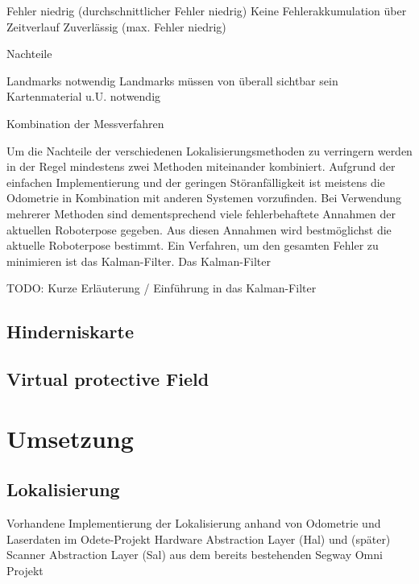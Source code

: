     Fehler niedrig (durchschnittlicher Fehler niedrig)
    Keine Fehlerakkumulation über Zeitverlauf
    Zuverlässig (max. Fehler niedrig) 

Nachteile

    Landmarks notwendig
    Landmarks müssen von überall sichtbar sein
    Kartenmaterial u.U. notwendig 
    
Kombination der Messverfahren

Um die Nachteile der verschiedenen Lokalisierungsmethoden zu verringern werden in der Regel mindestens zwei Methoden miteinander kombiniert. Aufgrund der einfachen Implementierung und der geringen Störanfälligkeit ist meistens die Odometrie in Kombination mit anderen Systemen vorzufinden. Bei Verwendung mehrerer Methoden sind dementsprechend viele fehlerbehaftete Annahmen der aktuellen Roboterpose gegeben. Aus diesen Annahmen wird bestmöglichst die aktuelle Roboterpose bestimmt. Ein Verfahren, um den gesamten Fehler zu minimieren ist das Kalman-Filter. 
 Das Kalman-Filter

    TODO: Kurze Erläuterung / Einführung in das Kalman-Filter

\subsection{Hinderniskarte}

\subsection{Virtual protective Field}

\section{Umsetzung}
\label{lokalisierung_umsetzung_sec}
\authorsection{\editordummy}

\subsection{Lokalisierung}
Vorhandene Implementierung der Lokalisierung anhand von Odometrie und Laserdaten
im Odete-Projekt
Hardware Abstraction Layer (Hal) und (später) Scanner Abstraction Layer (Sal)
aus dem bereits bestehenden Segway Omni Projekt

